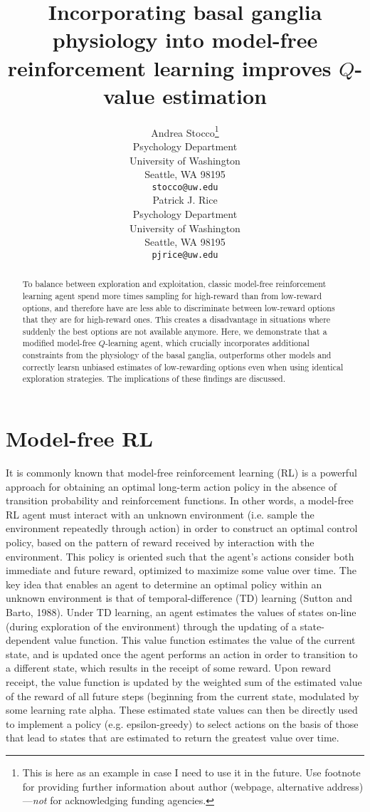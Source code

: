 \documentclass[11pt]{article} %
\title{Incorporating basal ganglia physiology into model-free reinforcement learning improves $Q$-value estimation}
\author{
Andrea Stocco\thanks{ This is here as an example in case I need to use it in the future. Use footnote for providing further information
about author (webpage, alternative address)---\emph{not} for acknowledging
funding agencies.} \\
Psychology Department\\
University of Washington\\
Seattle, WA 98195 \\
\texttt{stocco@uw.edu} \\
\And
Patrick J. Rice \\
Psychology Department\\
University of Washington\\
Seattle, WA 98195 \\
\texttt{pjrice@uw.edu} \\
}
\begin{document}
\maketitle

\begin{abstract}

To balance between exploration and exploitation, classic model-free reinforcement learning agent spend more times sampling for high-reward than from low-reward options, and therefore have are less able to discriminate between low-reward options that they are for high-reward ones. This creates a disadvantage in situations where suddenly the best options are not available anymore. Here, we demonstrate that a modified model-free $Q$-learning agent, which crucially incorporates additional constraints from the physiology of the basal ganglia, outperforms other models and correctly learsn unbiased estimates of low-rewarding options even when using identical exploration strategies. The implications of these findings are discussed. 
\end{abstract}




\startmain %

\section{Model-free RL}

It is commonly known that model-free reinforcement learning (RL) is a powerful approach for obtaining an optimal long-term action policy in the absence of transition probability and reinforcement functions. In other words, a model-free RL agent must interact with an unknown environment (i.e. sample the environment repeatedly through action) in order to construct an optimal control policy, based on the pattern of reward received by interaction with the environment. This policy is oriented such that the agent’s actions consider both immediate and future reward, optimized to maximize some value over time. The key idea that enables an agent to determine an optimal policy within an unknown environment is that of temporal-difference (TD) learning (Sutton and Barto, 1988). Under TD learning, an agent estimates the values of states on-line (during exploration of the environment) through the updating of a state-dependent value function. This value function estimates the value of the current state, and is updated once the agent performs an action in order to transition to a different state, which results in the receipt of some reward. Upon reward receipt, the value function is updated by the weighted sum of the estimated value of the reward of all future steps (beginning from the current state, modulated by some learning rate alpha. These estimated state values can then be directly used to implement a policy (e.g. epsilon-greedy) to select actions on the basis of those that lead to states that are estimated to return the greatest value over time.
\end{document}

